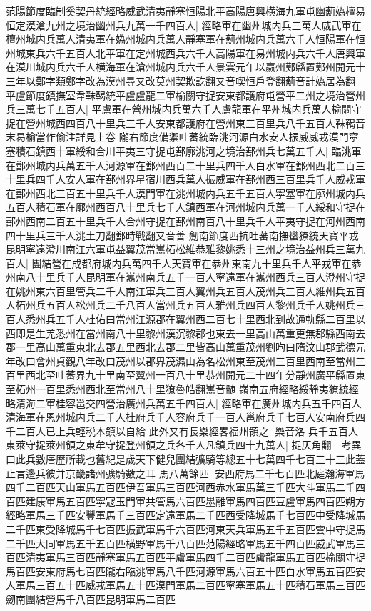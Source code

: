 范陽節度臨制奚契丹統經略威武清夷靜塞恒陽北平高陽唐興横海九軍屯幽薊媯檀易恒定漠滄九州之境治幽州兵九萬一千四百人|{
	經略軍在幽州城内兵三萬人威武軍在檀州城内兵萬人清夷軍在媯州城内兵萬人靜塞軍在薊州城内兵萬六千人恒陽軍在恒州城東兵六千五百人北平軍在定州城西兵六千人高陽軍在易州城内兵六千人唐興軍在漠川城内兵六千人横海軍在滄州城内兵六千人景雲元年以嬴州鄚縣置鄚州開元十三年以鄚字類鄭字改為漠州尋又改莫州契欺訖翻又音喫恒戶登翻薊音計媯居為翻}
平盧節度鎮撫室韋靺鞨統平盧盧龍二軍榆關守捉安東都護府屯營平二州之境治營州兵三萬七千五百人|{
	平盧軍在營州城内兵萬六千人盧龍軍在平州城内兵萬人榆關守捉在營州城西四百八十里兵三千人安東都護府在營州東三百里兵八千五百人靺鞨音末曷榆當作偷注詳見上卷}
隴右節度備禦吐蕃統臨洮河源白水安人振威威戎漠門寜塞積石鎮西十軍綏和合川平夷三守捉屯鄯廓洮河之境治鄯州兵七萬五千人|{
	臨洮軍在鄯州城内兵萬五千人河源軍在鄯州西百二十里兵四千人白水軍在鄯州西北二百三十里兵四千人安人軍在鄯州界星宿川西兵萬人振威軍在鄯州西三百里兵千人威戎軍在鄯州西北三百五十里兵千人漠門軍在洮州城内兵五千五百人寜塞軍在廓州城内兵五百人積石軍在廓州西百八十里兵七千人鎮西軍在河州城内兵萬一千人綏和守捉在鄯州西南二百五十里兵千人合州守捉在鄯州南百八十里兵千人平夷守捉在河州西南四十里兵三千人洮土刀翻鄯時戰翻又音善}
劒南節度西抗吐蕃南撫蠻獠統天寶平戎昆明寜遠澄川南江六軍屯益翼茂當嶲柘松維恭雅黎姚悉十三州之境治益州兵三萬九百人|{
	團結營在成都府城内兵萬四千人天寶軍在恭州東南九十里兵千人平戎軍在恭州南八十里兵千人昆明軍在嶲州南兵五千一百人寜遠軍在嶲州西兵三百人澄州守捉在姚州東六百里管兵二千人南江軍兵三百人翼州兵五百人茂州兵三百人維州兵五百人柘州兵五百人松州兵二千八百人當州兵五百人雅州兵四百人黎州兵千人姚州兵三百人悉州兵五千人杜佑曰當州江源郡在翼州西二百七十里西北到故通軌縣二百里以西即是生羌悉州在當州南八十里黎州漢沉黎郡也東去一里高山萬重更無郡縣西南去郡一里高山萬重東北去郡五里西北去郡二里皆高山萬重茂州劉昫曰隋汶山郡武德元年改曰會州貞觀八年改曰茂州以郡界茂濕山為名松州東至茂州三百里西南至當州三百里西北至吐蕃界九十里南至翼州一百八十里恭州開元二十四年分靜州廣平縣置東至柘州一百里悉州西北至當州八十里獠魯皓翻嶲音髄}
嶺南五府經略綏靜夷獠統經略清海二軍桂容邕交四營治廣州兵萬五千四百人|{
	經略軍在廣州城内兵五千四百人清海軍在恩州城内兵二千人桂府兵千人容府兵千一百人邕府兵千七百人安南府兵四千二百人已上兵輕税本鎮以自給}
此外又有長樂經畧福州領之|{
	樂音洛}
兵千五百人東萊守捉萊州領之東牟守捉登州領之兵各千人凡鎮兵四十九萬人|{
	捉仄角翻　考異曰此兵數唐歷所載也舊紀是歲天下健兒團結彍騎等總五十七萬四千七百三十三此蓋止言邊兵彼并京畿諸州彍騎數之耳}
馬八萬餘匹|{
	安西府馬二千七百匹北庭瀚海軍馬四千二百匹天山軍馬五百匹伊吾軍馬三百匹河西赤水軍馬萬三千匹大斗軍馬二千四百匹建康軍馬五百匹寜寇玉門軍共管馬六百匹墨離軍馬四百匹豆盧軍馬四百匹朔方經略軍馬三千匹安豐軍馬千三百匹定遠軍馬二千匹西受降城馬千七百匹中受降城馬二千匹東受降城馬千七百匹振武軍馬千六百匹河東天兵軍馬五千五百匹雲中守捉馬二千匹大同軍馬五千五百匹横野軍馬千八百匹范陽經略軍馬五千四百匹威武軍馬三百匹清夷軍馬三百匹靜塞軍馬五百匹平盧軍馬四千二百匹盧龍軍馬五百匹榆關守捉馬百匹安東府馬七百匹隴右臨洮軍馬八千匹河源軍馬六百五十匹白水軍馬五百匹安人軍馬三百五十匹威戎軍馬五十匹漠門軍馬二百匹寜塞軍馬五十匹積石軍馬三百匹劒南團結營馬千八百匹昆明軍馬二百匹}
